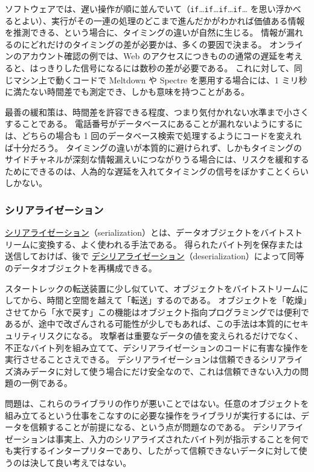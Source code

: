 \documentclass[uplatex]{jsarticle}
\def\label#1{}%
\begin{document}
ソフトウェアでは、遅い操作が順に並んでいて（\texttt{if}…\texttt{if}…\texttt{if}…\texttt{if}… を思い浮かべるとよい）、実行がその一連の処理のどこまで進んだかがわかれば価値ある情報を推測できる、という場合に、タイミングの違いが自然に生じる。
情報が漏れるのにどれだけのタイミングの差が必要かは、多くの要因で決まる。
オンラインのアカウント確認の例では、Web のアクセスにつきものの通常の遅延を考えると、はっきりした信号になるには数秒の差が必要である。
これに対して、同じマシン上で動くコードで Meltdown や Spectre を悪用する場合には、1 ミリ秒に満たない時間差でも測定でき、しかも意味を持つことがある。

最善の緩和策は、時間差を許容できる程度、つまり気付かれない水準まで小さくすることである。
電話番号がデータベースにあることが漏れないようにするには、どちらの場合も 1 回のデータベース検索で処理するようにコードを変えれば十分だろう。
タイミングの違いが本質的に避けられず、しかもタイミングのサイドチャネルが深刻な情報漏えいにつながりうる場合には、リスクを緩和するためにできるのは、人為的な遅延を入れてタイミングの信号をぼかすことくらいしかない。

\subsubsection{シリアライゼーション}

\begin{dfn}[シリアライゼーション]\label{dfn:ch8-serialization}
\underline{シリアライゼーション}（serialization）とは、データオブジェクトをバイトストリームに変換する、よく使われる手法である。
得られたバイト列を保存または送信しておけば、後で \underline{デシリアライゼーション}（deserialization）によって同等のデータオブジェクトを再構成できる。
\end{dfn}

スタートレックの転送装置に少し似ていて、オブジェクトをバイトストリームにしてから、時間と空間を越えて「転送」するのである。
オブジェクトを「乾燥」させてから「水で戻す」この機能はオブジェクト指向プログラミングでは便利であるが、途中で改ざんされる可能性が少しでもあれば、この手法は本質的にセキュリティリスクになる。
攻撃者は重要なデータの値を変えられるだけでなく、不正なバイト列を組み立てて、デシリアライゼーションのコードに有害な操作を実行させることさえできる。
デシリアライゼーションは信頼できるシリアライズ済みデータに対して使う場合にだけ安全なので、これは信頼できない入力の問題の一例である。

問題は、これらのライブラリの作りが悪いことではない。任意のオブジェクトを組み立てるという仕事をこなすのに必要な操作をライブラリが実行するには、データを信頼することが前提になる、という点が問題なのである。
デシリアライゼーションは事実上、入力のシリアライズされたバイト列が指示することを何でも実行するインタープリターであり、したがって信頼できないデータに対して使うのは決して良い考えではない。
\end{document}
